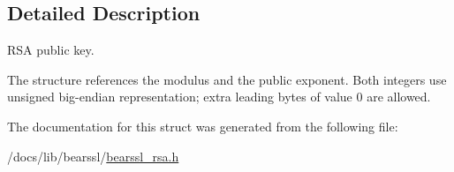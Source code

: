 \subsection{Detailed Description}
R\+SA public key. 

The structure references the modulus and the public exponent. Both integers use unsigned big-\/endian representation; extra leading bytes of value 0 are allowed. 

The documentation for this struct was generated from the following file\+:\begin{DoxyCompactItemize}
\item 
/docs/lib/bearssl/\hyperlink{bearssl__rsa_8h}{bearssl\+\_\+rsa.\+h}\end{DoxyCompactItemize}
